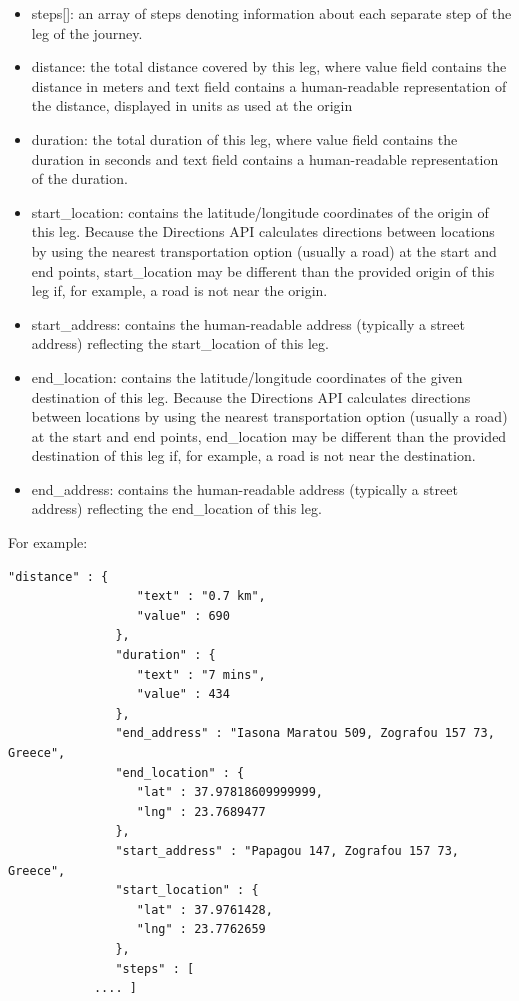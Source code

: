 \begin{itemize}
 \item steps[]: an array of steps denoting information about each separate step of the leg of the journey.
 \item distance: the total distance covered by this leg, where value field contains the distance in meters and text field contains a human-readable representation of 
 the distance, displayed in units as used at the origin
 \item duration: the total duration of this leg, where value field contains the duration in seconds and text field contains a human-readable representation of the duration.
 \item start\_location: contains the latitude/longitude coordinates of the origin of this leg. Because the Directions API calculates directions between locations 
 by using the nearest transportation option (usually a road) at the start and end points, start\_location may be different than the provided origin of this leg 
 if, for example, a road is not near the origin.
 \item start\_address: contains the human-readable address (typically a street address) reflecting the start\_location of this leg.
 \item end\_location: contains the latitude/longitude coordinates of the given destination of this leg. Because the Directions API calculates directions 
 between locations by using the nearest transportation option (usually a road) at the start and end points, end\_location may be different than the provided 
 destination of this leg if, for example, a road is not near the destination.
 \item end\_address: contains the human-readable address (typically a street address) reflecting the end\_location of this leg.
\end{itemize}

For example:

\begin{lstlisting}[basicstyle=\footnotesize\ttfamily, breaklines=true]
	      "distance" : {
                  "text" : "0.7 km",
                  "value" : 690
               },
               "duration" : {
                  "text" : "7 mins",
                  "value" : 434
               },
               "end_address" : "Iasona Maratou 509, Zografou 157 73, Greece",
               "end_location" : {
                  "lat" : 37.97818609999999,
                  "lng" : 23.7689477
               },
               "start_address" : "Papagou 147, Zografou 157 73, Greece",
               "start_location" : {
                  "lat" : 37.9761428,
                  "lng" : 23.7762659
               },
               "steps" : [
		    .... ]
\end{lstlisting}

